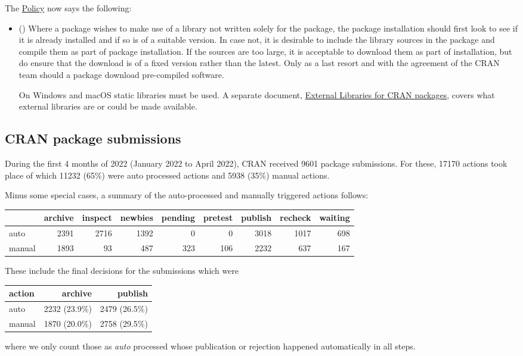 The
\href{https://CRAN.R-project.org/web/packages/policies.html}{Policy}
now says the following:
\begin{itemize}
 \item ()
  Where a package
wishes to make use of a library not written solely for the package, the
package installation should first look to see if it is already installed
and if so is of a suitable version.  In case not, it is desirable to
include the library sources in the package and compile them as part of
package installation.  If the sources are too large, it is acceptable to
download them as part of installation, but do ensure that the download
is of a fixed version rather than the latest.  Only as a last resort
and with the agreement of the CRAN team should a package download
pre-compiled software.

On Windows and macOS static libraries must be used. A separate document,
\href{https://CRAN.R-project.org/web/packages/external_libs.html}{External
  Libraries for CRAN packages}, covers what external libraries are or
could be made available.
\end{itemize}

\subsection{CRAN package submissions}

During the first 4 months of 2022 (January 2022 to April 2022), CRAN 
received 9601 package submissions.
For these, 17170 actions took place of which 11232 (65\%) were auto
processed actions and 5938 (35\%) manual actions.

Minus some special cases, a summary of the auto-processed and manually
triggered actions follows:
\begin{center}
\begin{tabular}{l|rrrrrrrr}
           &archive& inspect& newbies& pending& pretest& publish& 
recheck& waiting\\ \hline
   auto    &  2391 &   2716 &   1392 &      0 &      0 &   3018 &   1017 
&    698\\
   manual  &  1893 &     93 &    487 &    323 &    106 &   2232 &    637 
&    167
\end{tabular}
\end{center}

These include the final decisions for the submissions which were
\begin{center}
\begin{tabular}{l|rr}
action & archive        & publish\\ \hline
auto   &   2232 (23.9\%)  & 2479 (26.5\%)\\
manual &   1870 (20.0\%)  & 2758 (29.5\%)
\end{tabular}
\end{center}
where we only count those as \emph{auto} processed whose publication or
rejection happened automatically in all steps.


